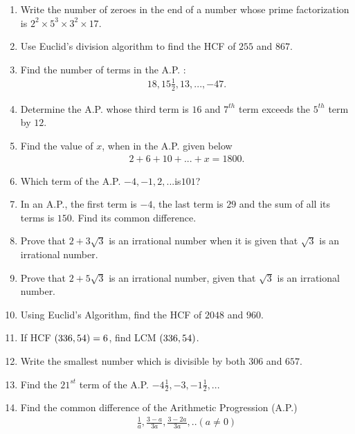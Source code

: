 \begin{enumerate}
\item Write the number of zeroes in the end of a number whose prime factorization is $2^2 \times 5^3 \times 3^2 \times 17$.

\item Use Euclid's division algorithm to find the HCF of $255$ and $867$.

\item Find the number of terms in the A.P. :
\begin{align*}
    18,15\frac{1}{2},13, ...,-47.
\end{align*}

\item Determine the A.P. whose third term is $16$ and $7^{th}$ term exceeds the $5^{th}$ term by $12$.

\item Find the value of $x$, when in the A.P. given below
\begin{align*}
2 + 6 + 10 + ... + x = 1800.    
\end{align*}

\item Which term of the A.P. $-4, - 1, 2, ... $is$ 101$?

\item In an A.P., the first term is $- 4$, the last term is $29$ and the sum of all its terms is $150$. Find its common difference.

\item Prove that $2 + 3\sqrt{3}$ is an irrational number when it is given that $\sqrt{3}$ is an irrational number.

\item Prove that $2+5\sqrt{3}$ is an irrational number, given that $\sqrt{3}$ is an irrational number.

\item Using Euclid's Algorithm, find the HCF of $2048$ and $960$.

\item If HCF $\left(336, 54\right) = 6$, find LCM $\left(336, 54\right)$.

\item Write the smallest number which is divisible by both $306$ and $657$.

\item Find the $21^{st}$ term of the A.P. $-4 \frac{1}{2},-3,-1\frac{1}{2},...$

\item Find the common difference of the Arithmetic Progression (A.P.) 
\begin{align*}
\frac{1}{a} , \frac{3-a}{3a},\frac{3-2a}{3a} , . . (a \neq 0)
\end{align*}


\end{enumerate}
